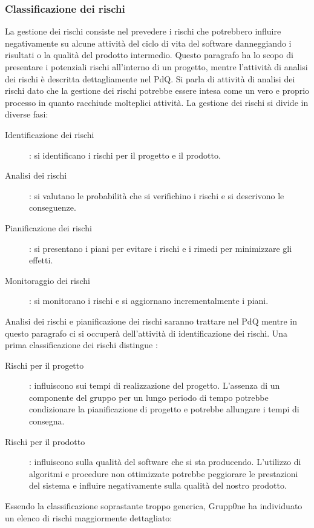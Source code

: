 \documentclass[../norme-di-progetto.tex]{subfiles}
\begin{document}
\subsubsection{Classificazione dei rischi}%
\label{subs:classificazione dei rischi}
La gestione dei rischi consiste nel prevedere i rischi che potrebbero influire negativamente su alcune attività del ciclo di vita del software danneggiando i risultati o la qualità del prodotto intermedio. Questo paragrafo ha lo scopo di presentare i potenziali rischi all'interno di un progetto, mentre l'attività di analisi dei rischi è descritta dettagliamente nel PdQ. Si parla di attività di analisi dei rischi dato che la gestione dei rischi potrebbe essere intesa come un vero e proprio processo in quanto racchiude molteplici attività. La gestione dei rischi si divide in diverse fasi:
\begin{description}
  \item [Identificazione dei rischi]: si identificano i rischi per il progetto e il prodotto.
  \item [Analisi dei rischi]: si valutano le probabilità che si verifichino i rischi e si descrivono le conseguenze.
  \item [Pianificazione dei rischi]: si presentano i piani per evitare i rischi e i rimedi per minimizzare gli effetti.
  \item [Monitoraggio dei rischi]: si monitorano i rischi e si aggiornano incrementalmente i piani.
\end{description}
Analisi dei rischi e pianificazione dei rischi saranno trattare nel PdQ mentre in questo paragrafo ci si occuperà dell'attività di identificazione dei rischi.
Una prima classificazione dei rischi distingue :
\begin{description}
  \item [Rischi per il progetto]: influiscono sui tempi di realizzazione del progetto. L'assenza di un componente del gruppo per un lungo periodo di tempo potrebbe condizionare la pianificazione di progetto e potrebbe allungare i tempi di consegna.
  \item [Rischi per il prodotto]: influiscono sulla qualità del software che si sta producendo. L'utilizzo di algoritmi e procedure non ottimizzate potrebbe peggiorare le prestazioni del sistema e influire negativamente sulla qualità del nostro prodotto.
\end{description}
Essendo la classificazione soprastante troppo generica, Grupp0ne ha individuato un elenco di rischi maggiormente dettagliato:
\end{document}
